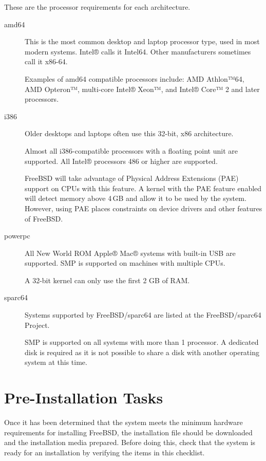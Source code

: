 These are the processor requirements for each architecture.
\begin{description}
\item[amd64]
   This is the most common desktop and laptop processor type, used in most modern systems.
   Intel® calls it Intel64.
   Other manufacturers sometimes call it x86-64.

   Examples of amd64 compatible processors include: AMD Athlon™64, AMD Opteron™, multi-core Intel® Xeon™, and Intel® Core™ 2 and later processors.
\item[i386]
   Older desktops and laptops often use this 32-bit, x86 architecture.

   Almost all i386-compatible processors with a floating point unit are supported.
   All Intel® processors 486 or higher are supported.

   FreeBSD will take advantage of Physical Address Extensions (PAE) support on CPUs with this feature.
   A kernel with the PAE feature enabled will detect memory above 4\,GB and allow it to be used by the system.
   However, using PAE places constraints on device drivers and other features of FreeBSD.
\item[powerpc]
   All New World ROM Apple® Mac® systems with built-in USB are supported.
   SMP is supported on machines with multiple CPUs.

   A 32-bit kernel can only use the first 2 GB of RAM.
\item[sparc64]
   Systems supported by FreeBSD/sparc64 are listed at the FreeBSD/sparc64 Project.

   SMP is supported on all systems with more than 1 processor.
   A dedicated disk is required as it is not possible to share a disk with another operating system at this time.
\end{description}




\section{Pre-Installation Tasks}
Once it has been determined that the system meets the minimum hardware requirements for installing FreeBSD, the installation file should be downloaded and the installation media prepared.
Before doing this, check that the system is ready for an installation by verifying the items in this checklist.

